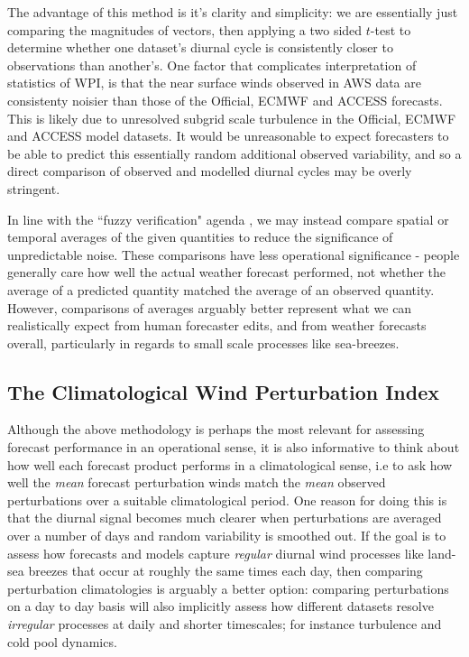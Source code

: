 \documentclass[alpha-refs]{wiley-article}
\begin{document}
The advantage of this method is it's clarity and simplicity: we are essentially just comparing the magnitudes of vectors, then applying a two sided $t$-test to determine whether one dataset's diurnal cycle is consistently closer to observations than another's. One factor that complicates interpretation of statistics of WPI, is that the near surface winds observed in AWS data are consistenty noisier than those of the Official, ECMWF and ACCESS forecasts. This is likely due to unresolved subgrid scale turbulence in the Official, ECMWF and ACCESS model datasets. It would be unreasonable to expect forecasters to be able to predict this essentially random additional observed variability, and so a direct comparison of observed and modelled diurnal cycles may be overly stringent. 

In line with the ``fuzzy verification" agenda \citep{ebert08}, we may instead compare spatial or temporal averages of the given quantities to reduce the significance of unpredictable noise. These comparisons have less operational significance - people generally care how well the actual weather forecast performed, not whether the average of a predicted quantity matched the average of an observed quantity. However, comparisons of averages arguably better represent what we can realistically expect from human forecaster edits, and from weather forecasts overall, particularly in regards to small scale processes like sea-breezes.

\subsection{The Climatological Wind Perturbation Index}\label{climatological-performance}
Although the above methodology is perhaps the most relevant for assessing forecast performance in an operational sense, it is also informative to think about how well each forecast product performs in a
climatological sense, i.e to ask how well the \emph{mean} forecast perturbation winds match the \emph{mean} observed perturbations over a suitable climatological period. One reason for doing this is that the diurnal signal becomes much clearer when perturbations are averaged over a number of days and random variability is smoothed out. If the goal is to assess how forecasts and models capture \emph{regular} diurnal wind processes like land-sea breezes that occur at roughly the same times each day, then comparing perturbation climatologies is arguably a better option: comparing perturbations on a day to day basis will also implicitly assess how different datasets resolve \emph{irregular} processes at daily and shorter timescales; for instance turbulence and cold pool dynamics.
\end{document}
